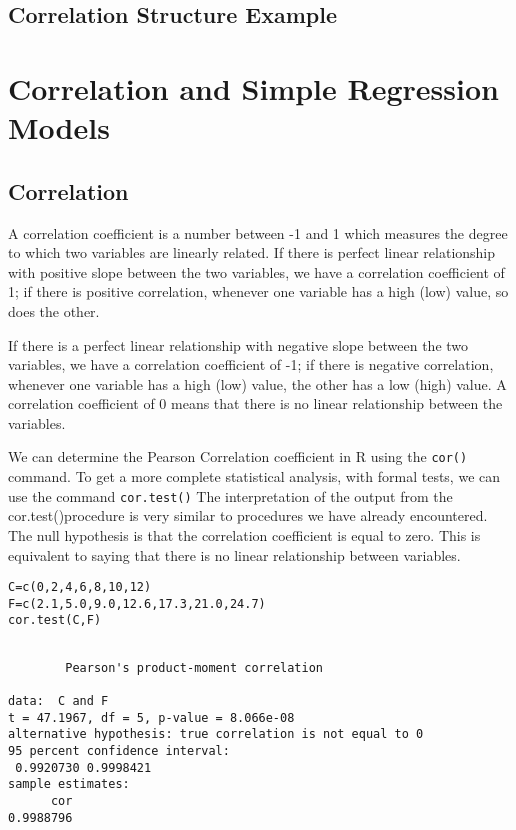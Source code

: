 
\subsection{Correlation Structure Example}


\newpage
\section{Correlation and Simple Regression Models}

\subsection{Correlation}

A correlation coefficient is a number between -1 and 1 which measures the degree to which two variables are linearly related. If there is perfect linear relationship with positive slope between the two variables, we have a correlation coefficient of 1; if there is positive correlation, whenever one variable has a high (low) value, so does the other.

If there is a perfect linear relationship with negative slope between the two variables, we have a correlation coefficient of -1; if there is negative correlation, whenever one variable has a high (low) value, the other has a low (high) value.
A correlation coefficient of 0 means that there is no linear relationship between the variables.

We can determine the Pearson Correlation coefficient in R using the \texttt{cor()} command.
To get a more complete statistical analysis, with formal tests, we can use the command \texttt{cor.test()}
The interpretation of the output from the cor.test()procedure is very similar to procedures we have already encountered. The null hypothesis is that the correlation coefficient is equal to zero. This is equivalent to saying that there is no linear relationship between variables.


\begin{framed}
\begin{verbatim}
C=c(0,2,4,6,8,10,12) 
F=c(2.1,5.0,9.0,12.6,17.3,21.0,24.7)
cor.test(C,F)
\end{verbatim}
\end{framed}
\begin{verbatim}

        Pearson's product-moment correlation

data:  C and F 
t = 47.1967, df = 5, p-value = 8.066e-08
alternative hypothesis: true correlation is not equal to 0 
95 percent confidence interval:
 0.9920730 0.9998421 
sample estimates:
      cor 
0.9988796 
\end{verbatim}



